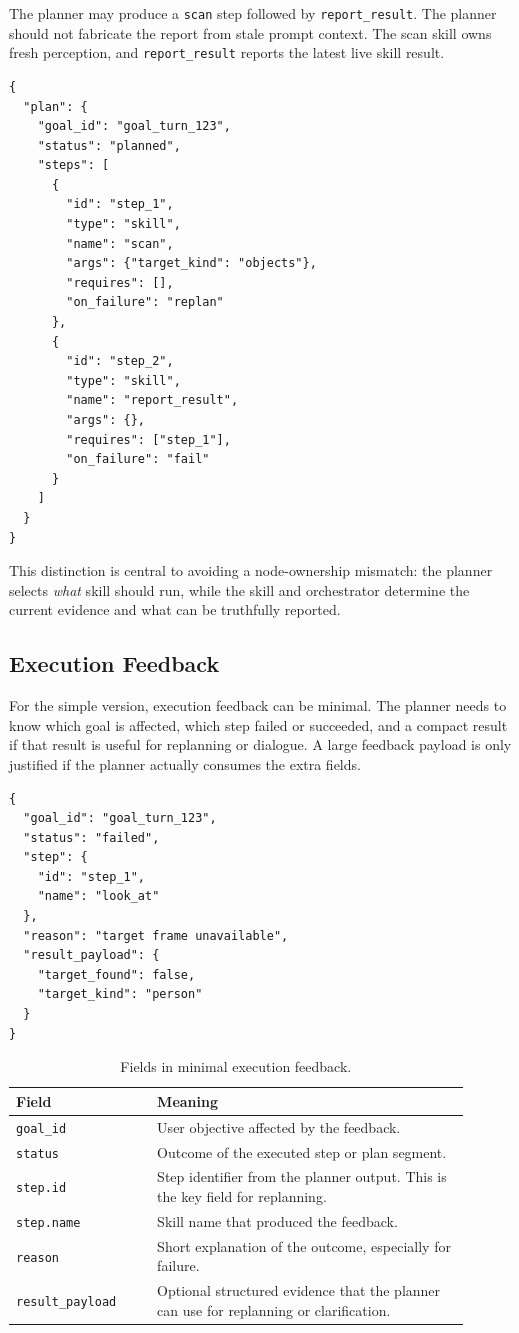 \documentclass[12pt,a4paper]{article}
\newcommand{\code}[1]{\texttt{#1}}
\begin{document}
The planner may produce a \code{scan} step followed by \code{report\_result}. The planner should not fabricate the report from stale prompt context. The scan skill owns fresh perception, and \code{report\_result} reports the latest live skill result.

\begin{lstlisting}
{
  "plan": {
    "goal_id": "goal_turn_123",
    "status": "planned",
    "steps": [
      {
        "id": "step_1",
        "type": "skill",
        "name": "scan",
        "args": {"target_kind": "objects"},
        "requires": [],
        "on_failure": "replan"
      },
      {
        "id": "step_2",
        "type": "skill",
        "name": "report_result",
        "args": {},
        "requires": ["step_1"],
        "on_failure": "fail"
      }
    ]
  }
}
\end{lstlisting}

This distinction is central to avoiding a node-ownership mismatch: the planner selects \emph{what} skill should run, while the skill and orchestrator determine the current evidence and what can be truthfully reported.

\subsection{Execution Feedback}

For the simple version, execution feedback can be minimal. The planner needs to know which goal is affected, which step failed or succeeded, and a compact result if that result is useful for replanning or dialogue. A large feedback payload is only justified if the planner actually consumes the extra fields.

\begin{lstlisting}
{
  "goal_id": "goal_turn_123",
  "status": "failed",
  "step": {
    "id": "step_1",
    "name": "look_at"
  },
  "reason": "target frame unavailable",
  "result_payload": {
    "target_found": false,
    "target_kind": "person"
  }
}
\end{lstlisting}

\begin{longtable}{p{0.28\linewidth}p{0.62\linewidth}}
\caption{Fields in minimal execution feedback.}\label{tab:feedback-fields}\\
\toprule
Field & Meaning\\
\midrule
\code{goal\_id} & User objective affected by the feedback.\\
\code{status} & Outcome of the executed step or plan segment.\\
\code{step.id} & Step identifier from the planner output. This is the key field for replanning.\\
\code{step.name} & Skill name that produced the feedback.\\
\code{reason} & Short explanation of the outcome, especially for failure.\\
\code{result\_payload} & Optional structured evidence that the planner can use for replanning or clarification.\\
\bottomrule
\end{longtable}
\end{document}
